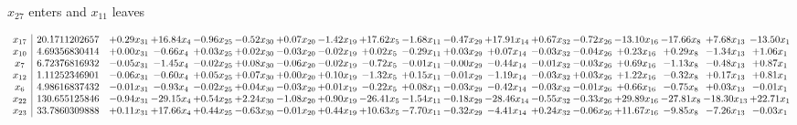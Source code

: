 \documentclass[9pt]{article}
\begin{document}
 $ x_{27} $ enters and $ x_{11} $ leaves 

 \[\begin{array}{c| c c@{\hskip 2pt} c@{\hskip 2pt} c@{\hskip 2pt} c@{\hskip 2pt} c@{\hskip 2pt} c@{\hskip 2pt} c@{\hskip 2pt} c@{\hskip 2pt} c@{\hskip 2pt} c@{\hskip 2pt} c@{\hskip 2pt} c@{\hskip 2pt} c@{\hskip 2pt} c@{\hskip 2pt} c@{\hskip 2pt} c@{\hskip 2pt} }
 x_{17}   &  20.1711202657 & +  0.29 x_{31} & + 16.84 x_{4} & -0.96 x_{25} & -0.52 x_{30} & +  0.07 x_{20} & -1.42 x_{19} & + 17.62 x_{5} & -1.68 x_{11} & -0.47 x_{29} & + 17.91 x_{14} & +  0.67 x_{32} & -0.72 x_{26} & -13.10 x_{16} & -17.66 x_{8} & +  7.68 x_{13} & -13.50 x_{1}\\
 x_{10}   &  4.69356830414 & +  0.00 x_{31} & -0.66 x_{4} & +  0.03 x_{25} & +  0.02 x_{30} & -0.03 x_{20} & -0.02 x_{19} & +  0.02 x_{5} & -0.29 x_{11} & +  0.03 x_{29} & +  0.07 x_{14} & -0.03 x_{32} & -0.04 x_{26} & +  0.23 x_{16} & +  0.29 x_{8} & -1.34 x_{13} & +  1.06 x_{1}\\
 x_{7}   &  6.72376816932 & -0.05 x_{31} & -1.45 x_{4} & -0.02 x_{25} & +  0.08 x_{30} & -0.06 x_{20} & -0.02 x_{19} & -0.72 x_{5} & -0.01 x_{11} & -0.00 x_{29} & -0.44 x_{14} & -0.01 x_{32} & -0.03 x_{26} & +  0.69 x_{16} & -1.13 x_{8} & -0.48 x_{13} & +  0.87 x_{1}\\
 x_{12}   &  1.11252346901 & -0.06 x_{31} & -0.60 x_{4} & +  0.05 x_{25} & +  0.07 x_{30} & +  0.00 x_{20} & +  0.10 x_{19} & -1.32 x_{5} & +  0.15 x_{11} & -0.01 x_{29} & -1.19 x_{14} & -0.03 x_{32} & +  0.03 x_{26} & +  1.22 x_{16} & -0.32 x_{8} & +  0.17 x_{13} & +  0.81 x_{1}\\
 x_{6}   &  4.98616837432 & -0.01 x_{31} & -0.93 x_{4} & -0.02 x_{25} & +  0.04 x_{30} & -0.03 x_{20} & +  0.01 x_{19} & -0.22 x_{5} & +  0.08 x_{11} & -0.03 x_{29} & -0.42 x_{14} & -0.03 x_{32} & -0.01 x_{26} & +  0.66 x_{16} & -0.75 x_{8} & +  0.03 x_{13} & -0.01 x_{1}\\
 x_{22}   &  130.655125846 & -0.94 x_{31} & -29.15 x_{4} & +  0.54 x_{25} & +  2.24 x_{30} & -1.08 x_{20} & +  0.90 x_{19} & -26.41 x_{5} & -1.54 x_{11} & -0.18 x_{29} & -28.46 x_{14} & -0.55 x_{32} & -0.33 x_{26} & + 29.89 x_{16} & -27.81 x_{8} & -18.30 x_{13} & + 22.71 x_{1}\\
 x_{23}   &  33.7860309888 & +  0.11 x_{31} & + 17.66 x_{4} & +  0.44 x_{25} & -0.63 x_{30} & -0.01 x_{20} & +  0.44 x_{19} & + 10.63 x_{5} & -7.70 x_{11} & -0.32 x_{29} & -4.41 x_{14} & +  0.24 x_{32} & -0.06 x_{26} & + 11.67 x_{16} & -9.85 x_{8} & -7.26 x_{13} & -0.03 x_{1}\\

\end{array}\]
\end{document}
